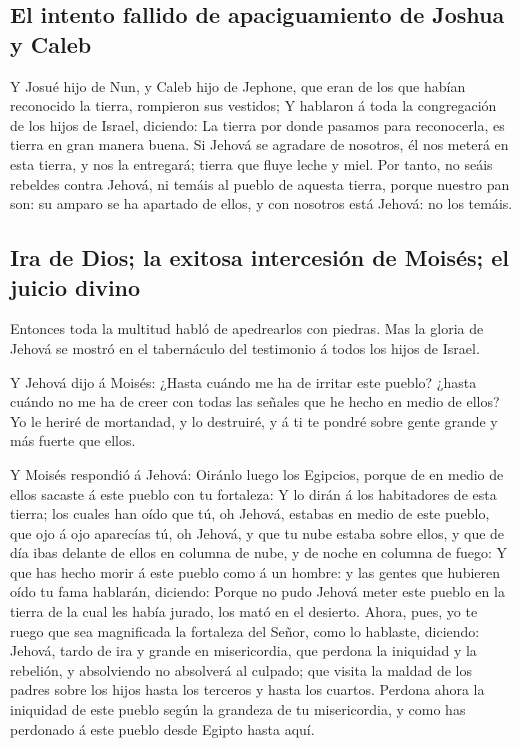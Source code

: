 \hypertarget{el-intento-fallido-de-apaciguamiento-de-joshua-y-caleb}{%
\subsection{El intento fallido de apaciguamiento de Joshua y
Caleb}\label{el-intento-fallido-de-apaciguamiento-de-joshua-y-caleb}}

 Y Josué hijo de Nun, y Caleb hijo de Jephone, que eran de
los que habían reconocido la tierra, rompieron sus vestidos;
 Y hablaron á toda la congregación de los hijos de Israel,
diciendo: La tierra por donde pasamos para reconocerla, es tierra en
gran manera buena.  Si Jehová se agradare de nosotros, él
nos meterá en esta tierra, y nos la entregará; tierra que fluye leche y
miel.  Por tanto, no seáis rebeldes contra Jehová, ni
temáis al pueblo de aquesta tierra, porque nuestro pan son: su amparo se
ha apartado de ellos, y con nosotros está Jehová: no los temáis.

\hypertarget{ira-de-dios-la-exitosa-intercesiuxf3n-de-moisuxe9s-el-juicio-divino}{%
\subsection{Ira de Dios; la exitosa intercesión de Moisés; el juicio
divino}\label{ira-de-dios-la-exitosa-intercesiuxf3n-de-moisuxe9s-el-juicio-divino}}

 Entonces toda la multitud habló de apedrearlos con
piedras. Mas la gloria de Jehová se mostró en el tabernáculo del
testimonio á todos los hijos de Israel.

 Y Jehová dijo á Moisés: ¿Hasta cuándo me ha de irritar
este pueblo? ¿hasta cuándo no me ha de creer con todas las señales que
he hecho en medio de ellos?  Yo le heriré de mortandad, y
lo destruiré, y á ti te pondré sobre gente grande y más fuerte que
ellos.

 Y Moisés respondió á Jehová: Oiránlo luego los Egipcios,
porque de en medio de ellos sacaste á este pueblo con tu fortaleza:
 Y lo dirán á los habitadores de esta tierra; los cuales
han oído que tú, oh Jehová, estabas en medio de este pueblo, que ojo á
ojo aparecías tú, oh Jehová, y que tu nube estaba sobre ellos, y que de
día ibas delante de ellos en columna de nube, y de noche en columna de
fuego:  Y que has hecho morir á este pueblo como á un
hombre: y las gentes que hubieren oído tu fama hablarán, diciendo:
 Porque no pudo Jehová meter este pueblo en la tierra de
la cual les había jurado, los mató en el desierto. 
Ahora, pues, yo te ruego que sea magnificada la fortaleza del Señor,
como lo hablaste, diciendo:  Jehová, tardo de ira y
grande en misericordia, que perdona la iniquidad y la rebelión, y
absolviendo no absolverá al culpado; que visita la maldad de los padres
sobre los hijos hasta los terceros y hasta los cuartos. 
Perdona ahora la iniquidad de este pueblo según la grandeza de tu
misericordia, y como has perdonado á este pueblo desde Egipto hasta
aquí.

